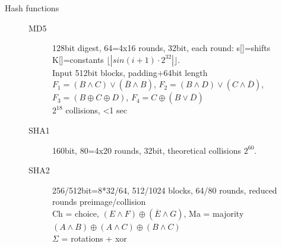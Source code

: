 \documentclass[a4paper]{article}
\begin{document}
\begin{description}
\item[Hash functions] \hfill
	\begin{description}
		\item[MD5] 128bit digest, 64=4x16 rounds, 32bit, each round: s[]=shifts K[]=constants $ \lfloor |sin(i+1)\cdot2^{32}| \rfloor$. \hfill\\
			Input 512bit blocks, padding+64bit length\\
			$F_1 = (B\land C)\lor(\overline{B}\land B)$, $F_2 = (B\land D)\lor(C\land\overline{D})$, $F_3 = (B\oplus C \oplus D)$, $F_4 = C \oplus (B \lor\overline{D})$\\
			$2^{18}$ collisions, <1 sec
		\item[SHA1] 160bit, 80=4x20 rounds, 32bit, theoretical collisions $2^{60}$.
		\item[SHA2] 256/512bit=8*32/64, 512/1024 blocks, 64/80 rounds, reduced rounds preimage/collision \hfill\\
			Ch = choice, $(E \land F)\oplus(\overline{E} \land G)$, Ma = majority $(A \land B)\oplus(A \land C)\oplus(B \land C)$ \\
			$\Sigma$ = rotations + xor
	\end{description}
	\begin{minipage}[t]{\linewidth}
	\raggedright
\end{minipage}
\end{description}
\end{document}
